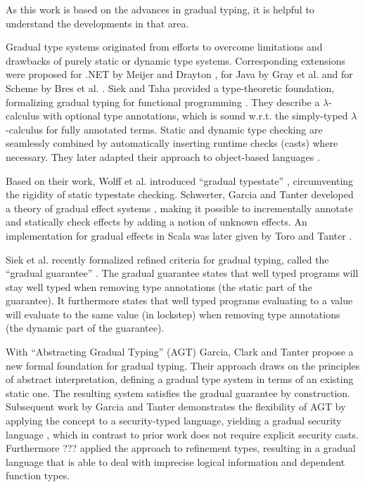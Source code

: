 As this work is based on the advances in gradual typing, it is helpful to understand the developments in that area.

Gradual type systems originated from efforts to overcome limitations and drawbacks of purely static or dynamic type systems.
Corresponding extensions were proposed for .NET by Meijer and Drayton \cite{meijer2004static}, for Java by Gray et al. \cite{gray2005fine} and for Scheme by Bres et al. \cite{bres2004compiling}.
Siek and Taha provided a type-theoretic foundation, formalizing gradual typing for functional programming \cite{siek2006gradual}.
They describe a $\lambda$-calculus with optional type annotations, which is sound w.r.t. the simply-typed $\lambda$-calculus for fully annotated terms.
Static and dynamic type checking are seamlessly combined by automatically inserting runtime checks (casts) where necessary.
They later adapted their approach to object-based languages \cite{siek2007gradual}.

Based on their work, Wolff et al. introduced “gradual typestate” \cite{wolff2011gradual}, circumventing the rigidity of static typestate checking.
Schwerter, Garcia and Tanter developed a theory of gradual effect systems \cite{banados2014theory}, making it possible to incrementally annotate and statically check effects by adding a notion of unknown effects.
An implementation for gradual effects in Scala was later given by Toro and Tanter \cite{toro2015customizable}.

\label{grad-guarantee}
Siek et al. recently formalized refined criteria for gradual typing, called the “gradual guarantee” \cite{siek2015refined}.
The gradual guarantee states that well typed programs will stay well typed when removing type annotations (the static part of the guarantee).
It furthermore states that well typed programs evaluating to a value will evaluate to the same value (in lockstep) when removing type annotations (the dynamic part of the guarantee).

With “Abstracting Gradual Typing” (AGT) \cite{garcia2016abstracting} Garcia, Clark and Tanter propose a new formal foundation for gradual typing.
Their approach draws on the principles of abstract interpretation, defining a gradual type system in terms of an existing static one.
The resulting system satisfies the gradual guarantee by construction.
Subsequent work by Garcia and Tanter demonstrates the flexibility of AGT by applying the concept to a security-typed language, yielding a gradual security language \cite{garcia2015deriving}, which in contrast to prior work does not require explicit security casts.
Furthermore ??? \cite{nico} applied the approach to refinement types, resulting in a gradual language that is able to deal with imprecise logical information and dependent function types.